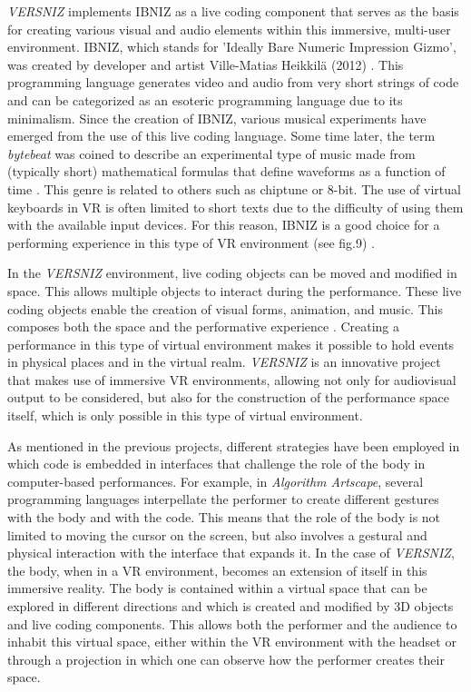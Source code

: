 \documentclass[12pt, twoside, a4paper]{report}
\begin{document}
\textit{VERSNIZ} implements IBNIZ as a live coding component that serves as the basis for creating various visual and audio elements within this immersive, multi-user environment. IBNIZ, which stands for 'Ideally Bare Numeric Impression Gizmo', was created by developer and artist Ville-Matias Heikkilä (2012) \citep{ibniz2}. This programming language generates video and audio from very short strings of code and can be categorized as an esoteric programming language due to its minimalism. Since the creation of IBNIZ, various musical experiments have emerged from the use of this live coding language. Some time later, the term \textit{bytebeat} was coined to describe an experimental type of music made from (typically short) mathematical formulas that define waveforms as a function of time \citep{ibniz}. This genre is related to others such as chiptune or 8-bit. The use of virtual keyboards in VR is often limited to short texts due to the difficulty of using them with the available input devices. For this reason, IBNIZ is a good choice for a performing experience in this type of VR environment (see fig.9) \citep{ver}.


In the \textit{VERSNIZ} environment, live coding objects can be moved and modified in space. This allows multiple objects to interact during the performance. These live coding objects enable the creation of visual forms, animation, and music. This composes both the space and the performative experience \citep{ver}. Creating a performance in this type of virtual environment makes it possible to hold events in physical places and in the virtual realm. \textit{VERSNIZ} is an innovative project that makes use of immersive VR environments, allowing not only for audiovisual output to be considered, but also for the construction of the performance space itself, which is only possible in this type of virtual environment.


As mentioned in the previous projects, different strategies have been employed in which code is embedded in interfaces that challenge the role of the body in computer-based performances. For example, in \textit{Algorithm Artscape}, several programming languages interpellate the performer to create different gestures with the body and with the code. This means that the role of the body is not limited to moving the cursor on the screen, but also involves a gestural and physical interaction with the interface that expands it. In the case of \textit{VERSNIZ}, the body, when in a VR environment, becomes an extension of itself in this immersive reality. The body is contained within a virtual space that can be explored in different directions and which is created and modified by 3D objects and live coding components. This allows both the performer and the audience to inhabit this virtual space, either within the VR environment with the headset or through a projection in which one can observe how the performer creates their space.
\end{document}

